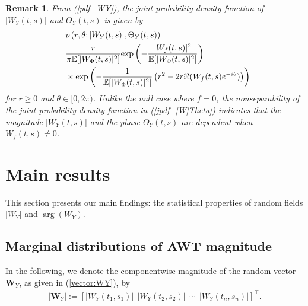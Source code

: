 \documentclass{amsart}
\newtheorem{Remark}{Remark}
\begin{document}
\begin{Remark}
From (\ref{pdf_WY}), the joint probability density function of $|W_{Y}(t,s)|$ and $\Theta_{Y}(t,s)$ is given by
 \begin{align}\label{jpdf_|W|Theta}
&p\left(r,\theta;|W_{Y}(t,s)|,\Theta_{Y}(t,s)\right)
\\\notag= & \frac{r}{\pi\mathbb{E}[|W_{\Phi}(t,s)|^2]}\textup{exp}\left(-\frac{|W_{f}(t,s)|^2}{\mathbb{E}[|W_{\Phi}(t,s)|^2]}\right)
\\\notag&\times\textup{exp}\left(-\frac{1}{\mathbb{E}[|W_{\Phi}(t,s)|^2]}\left(r^2-2r\Re(W_{f}(t,s)e^{-i\theta})\right)
\right)
\end{align}
for $r\geq0$ and $\theta\in [0,2\pi)$. Unlike the null case where $f=0$, the nonseparability of the joint probability density function in (\ref{jpdf_|W|Theta})
indicates that the magnitude $|W_{Y}(t,s)|$ and the phase $\Theta_{Y}(t,s)$ are dependent when $W_{f}(t,s)\neq0$.
\end{Remark}














\section{Main results}\label{sec:mainresult}
This section presents our main findings: the statistical properties of random fields $|W_{Y}|$ and $\arg(W_{Y})$.


\subsection{Marginal distributions of AWT magnitude}\label{sec:main:magnitude}
In the following, we denote the componentwise magnitude of the random vector $\mathbf{W}_{Y}$, as given in (\ref{vector:WY}), by
\begin{align*}%
|\mathbf{W}_{Y}|:=\left[|W_{Y}(t_{1},s_{1})|\ \ |W_{Y}(t_{2},s_{2})|\ \ \cdots\ \ |W_{Y}(t_{n},s_{n})|\right]^{\top}.
\end{align*}
\end{document}
